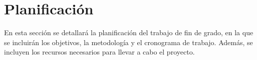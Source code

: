 \section{Planificación}
En esta sección se detallará la planificación del trabajo de fin de grado, en la que se incluirán los objetivos, la metodología y el cronograma de trabajo. Además, se incluyen los recursos necesarios para llevar a cabo el proyecto.



